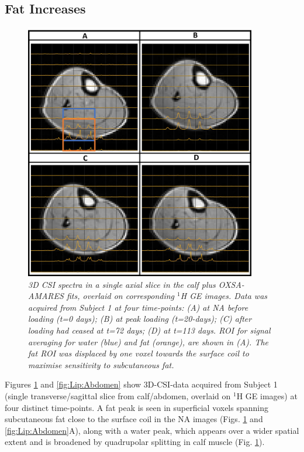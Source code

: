 \subsection{Fat Increases}

\begin{figure}
    \centering
    \includegraphics[width=0.9\textwidth]{Figures/Lipid/Calf.png}
    \caption{\textit{3D \ac{CSI} spectra in a single axial slice in the calf plus OXSA-AMARES fits, overlaid on corresponding $^1$H \ac{GE} images. Data was acquired from Subject 1 at four time-points: (A) at \ac{NA} before loading (t=0 days); (B) at peak loading (t=20-days); (C) after loading had ceased at t=72 days; (D) at t=113 days. ROI for signal averaging for water (blue) and fat (orange), are shown in (A). The fat \ac{ROI} was displaced by one voxel towards the surface coil to maximise sensitivity to subcutaneous fat.}}
    \label{fig:Lip:Calf}
\end{figure}

Figures \ref{fig:Lip:Calf} and \ref{fig:Lip:Abdomen} show 3D-\ac{CSI}-data acquired from Subject 1 (single transverse/sagittal slice from calf/abdomen, overlaid on $^1$H GE images) at four distinct time-points. A fat peak is seen in superficial voxels spanning subcutaneous fat close to the surface coil in the \ac{NA} images (Figs. \ref{fig:Lip:Calf} and \ref{fig:Lip:Abdomen}A), along with a water peak, which appears over a wider spatial extent and is broadened by quadrupolar splitting in calf muscle (Fig. \ref{fig:Lip:Calf}). 

